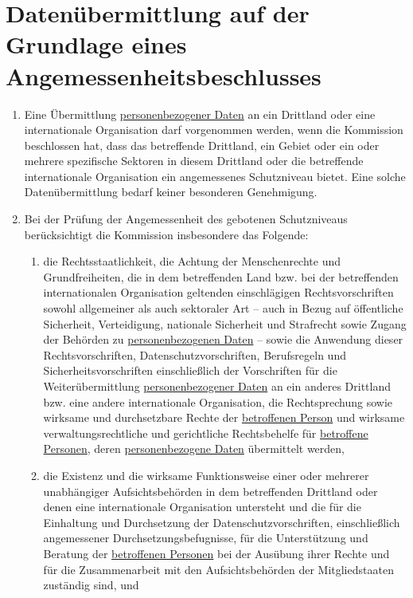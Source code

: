 \chapter{Datenübermittlung auf der Grundlage eines Angemessenheitsbeschlusses}
\label{ch:45}


\begin{enumerate}

  \item Eine Übermittlung \hyperref[itm:04-1]{personenbezogener Daten} an ein Drittland oder eine internationale Organisation darf
   vorgenommen werden, wenn die Kommission beschlossen hat, dass das betreffende Drittland, ein Gebiet oder ein oder
   mehrere spezifische Sektoren in diesem Drittland oder die betreffende internationale Organisation ein angemessenes
   Schutzniveau bietet. Eine solche Datenübermittlung bedarf keiner besonderen Genehmigung.
  \label{itm:45-1}

  \item Bei der Prüfung der Angemessenheit des gebotenen Schutzniveaus berücksichtigt die Kommission insbesondere das
   Folgende:
  \label{itm:45-2}

  \begin{enumerate}
  
    \item die Rechtsstaatlichkeit, die Achtung der Menschenrechte und Grundfreiheiten, die in dem betreffenden Land bzw.
     bei der betreffenden internationalen Organisation geltenden einschlägigen Rechtsvorschriften sowohl allgemeiner
     als auch sektoraler Art -- auch in Bezug auf öffentliche Sicherheit, Verteidigung, nationale Sicherheit und
     Strafrecht sowie Zugang der Behörden zu \hyperref[itm:04-1]{personenbezogenen Daten} -- sowie die Anwendung dieser Rechtsvorschriften,
     Datenschutzvorschriften, Berufsregeln und Sicherheitsvorschriften einschließlich der Vorschriften für die
     Weiterübermittlung \hyperref[itm:04-1]{personenbezogener Daten} an ein anderes Drittland bzw. eine andere internationale Organisation,
     die Rechtsprechung sowie wirksame und durchsetzbare Rechte der \hyperref[itm:04-1]{betroffenen Person} und wirksame
     verwaltungsrechtliche und gerichtliche Rechtsbehelfe für \hyperref[itm:04-1]{betroffene Personen}, deren \hyperref[itm:04-1]{personenbezogene Daten}
     übermittelt werden,
    \label{itm:45-2a}

    \item die Existenz und die wirksame Funktionsweise einer oder mehrerer unabhängiger Aufsichtsbehörden in dem
     betreffenden Drittland oder denen eine internationale Organisation untersteht und die für die Einhaltung und
     Durchsetzung der Datenschutzvorschriften, einschließlich angemessener Durchsetzungsbefugnisse, für die
     Unterstützung und Beratung der \hyperref[itm:04-1]{betroffenen Personen} bei der Ausübung ihrer Rechte und für die Zusammenarbeit mit
     den Aufsichtsbehörden der Mitgliedstaaten zuständig sind, und
    \label{itm:45-2b}


\end{enumerate}
\end{enumerate}
